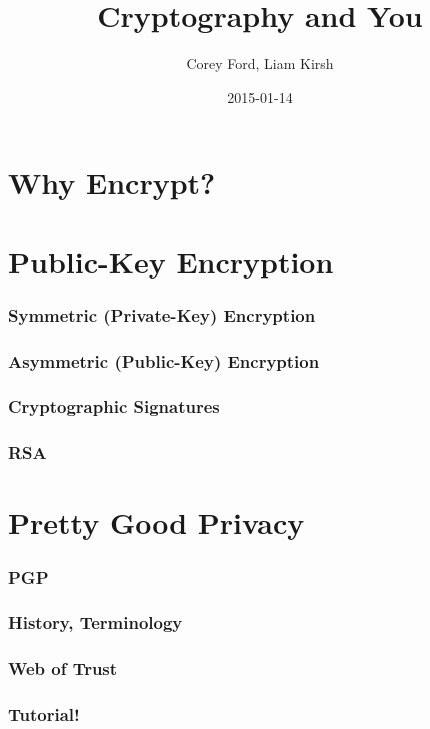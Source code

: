 \documentclass{beamer}
\title{Cryptography and You}
\author{Corey Ford, Liam Kirsh}
\institute{The White Hat}
\date{2015-01-14}
\begin{document}
\frame{\titlepage}

\section{Why Encrypt?}

\section{Public-Key Encryption}

\begin{frame}
  \frametitle{Symmetric (Private-Key) Encryption}
\end{frame}

\begin{frame}
  \frametitle{Asymmetric (Public-Key) Encryption}
\end{frame}

\begin{frame}
  \frametitle{Cryptographic Signatures}
\end{frame}

\begin{frame}
  \frametitle{RSA}
\end{frame}

\section{Pretty Good Privacy}

\begin{frame}
  \frametitle{PGP}
\end{frame}

\begin{frame}
  \frametitle{History, Terminology}
\end{frame}

\begin{frame}
  \frametitle{Web of Trust}
\end{frame}

\begin{frame}
  \frametitle{Tutorial!}
\end{frame}
\end{document}
